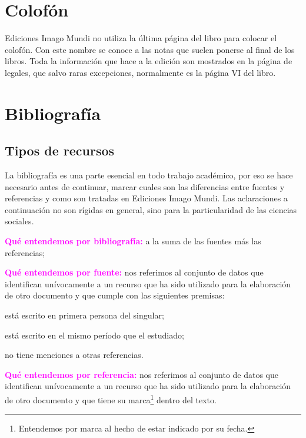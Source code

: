 \documentclass{book}
\begin{document}
{{{{{{{{{{{{{{{{{\section{Colofón}

Ediciones Imago Mundi no utiliza la última página del libro para colocar el colofón. Con este nombre se conoce a las notas que suelen ponerse al final de los libros. Toda la información que hace a la edición son mostrados en la página de legales, que salvo raras excepciones, normalmente es la página VI del libro.

\section{Bibliografía \label{biblio}}

\subsection{Tipos de recursos}

La bibliografía es una parte esencial en todo trabajo académico, por eso se hace necesario antes de continuar, marcar cuales son las diferencias entre fuentes y referencias y como son tratadas en Ediciones Imago Mundi. Las aclaraciones a continuación no son rígidas en general, sino para la particularidad de las ciencias sociales.

\begin{compactdesc}
\item [\textcolor{magenta}{\textbf{Qué entendemos por bibliografía:}}] a la suma de las fuentes más las referencias;
\item [\textcolor{magenta}{\textbf{Qué entendemos por fuente:}}] nos referimos al conjunto de datos que identifican unívocamente a un recurso que ha sido utilizado para la elaboración de otro documento y que cumple con las siguientes premisas:
	\begin{compactenum}
	\item está escrito en primera persona del singular;
	\item está escrito en el mismo período que el estudiado;
	\item no tiene menciones a otras referencias.
	\end{compactenum}
\item [\textcolor{magenta}{\textbf{Qué entendemos por referencia:}}] nos referimos al conjunto de datos que identifican unívocamente a un recurso que ha sido utilizado para la elaboración de otro documento y que tiene su marca\footnote{Entendemos por marca al hecho de estar indicado por su fecha.} dentro del texto.
\end{compactdesc}

}}}}}}}}}}}}}}}}}
\end{document}
